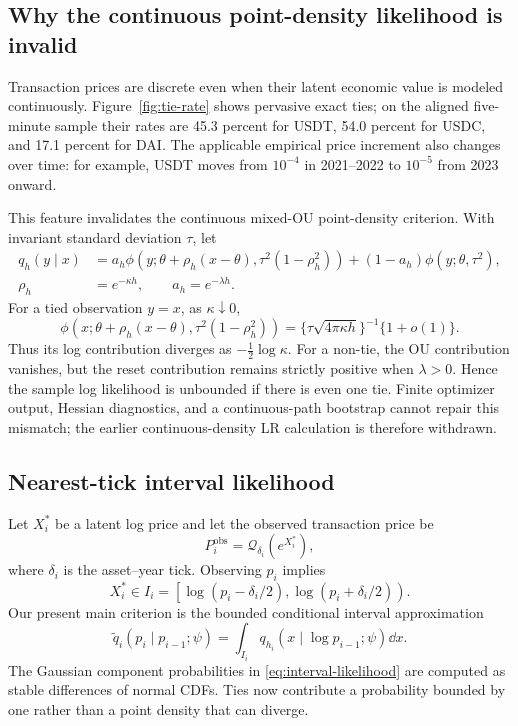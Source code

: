 \subsection{Why the continuous point-density likelihood is invalid}

Transaction prices are discrete even when their latent economic value is
modeled continuously.  Figure~\ref{fig:tie-rate} shows pervasive exact ties;
on the aligned five-minute sample their rates are 45.3 percent for USDT,
54.0 percent for USDC, and 17.1 percent for DAI.  The applicable empirical
price increment also changes over time: for example, USDT moves from
$10^{-4}$ in 2021--2022 to $10^{-5}$ from 2023 onward.

This feature invalidates the continuous mixed-OU point-density criterion.
With invariant standard deviation $\tau$, let
\begin{align}
q_h(y\mid x)
&=a_h\phi\!\left(y;
\theta+\rho_h(x-\theta),\tau^2(1-\rho_h^2)\right)
 +(1-a_h)\phi(y;\theta,\tau^2),                 \label{eq:continuous-mou}\\
\rho_h&=e^{-\kappa h},\qquad a_h=e^{-\lambda h}.
\end{align}
For a tied observation $y=x$, as $\kappa\downarrow0$,
\[
 \phi\!\left(x;\theta+\rho_h(x-\theta),
 \tau^2(1-\rho_h^2)\right)
 =\{\tau\sqrt{4\pi\kappa h}\}^{-1}\{1+o(1)\}.
\]
Thus its log contribution diverges as $-\tfrac12\log\kappa$.  For a non-tie,
the OU contribution vanishes, but the reset contribution remains strictly
positive when $\lambda>0$.  Hence the sample log likelihood is unbounded if
there is even one tie.  Finite optimizer output, Hessian diagnostics, and a
continuous-path bootstrap cannot repair this mismatch; the earlier
continuous-density LR calculation is therefore withdrawn.

\subsection{Nearest-tick interval likelihood}

Let $X_i^*$ be a latent log price and let the observed transaction price be
\[
 P_i^{\mathrm{obs}}=\mathcal Q_{\delta_i}(e^{X_i^*}),
\]
where $\delta_i$ is the asset--year tick.  Observing $p_i$ implies
\begin{equation}
 X_i^*\in I_i=
 \left[\log(p_i-\delta_i/2),\log(p_i+\delta_i/2)\right).
 \label{eq:rounding-bin}
\end{equation}
Our present main criterion is the bounded conditional interval approximation
\begin{equation}
 \widetilde q_i(p_i\mid p_{i-1};\psi)
 =\int_{I_i}q_{h_i}\!\left(x\mid\log p_{i-1};\psi\right)\dd x.
 \label{eq:interval-likelihood}
\end{equation}
The Gaussian component probabilities in \eqref{eq:interval-likelihood} are
computed as stable differences of normal CDFs.  Ties now contribute a
probability bounded by one rather than a point density that can diverge.


